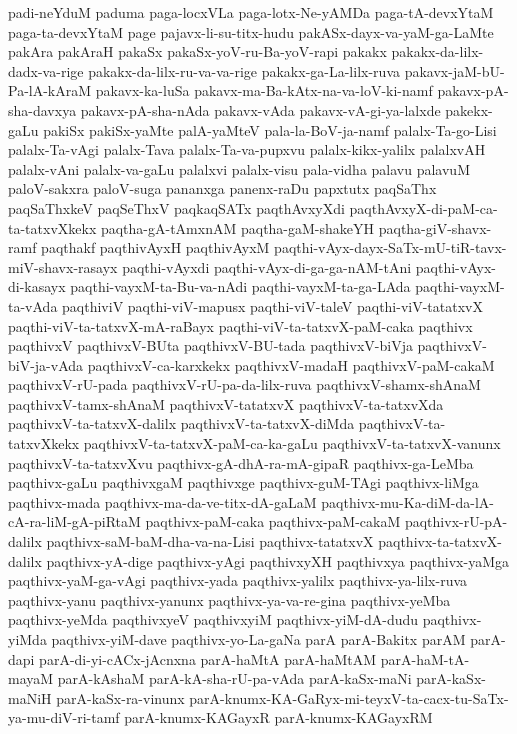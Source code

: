 {padi-neYduM
paduma
paga-locxVLa
paga-lotx-Ne-yAMDa
paga-tA-devxYtaM
paga-ta-devxYtaM
page
pajavx-li-su-titx-hudu
pakASx-dayx-va-yaM-ga-LaMte
pakAra
pakAraH
pakaSx
pakaSx-yoV-ru-Ba-yoV-rapi
pakakx
pakakx-da-lilx-dadx-va-rige
pakakx-da-lilx-ru-va-va-rige
pakakx-ga-La-lilx-ruva
pakavx-jaM-bU-Pa-lA-kAraM
pakavx-ka-luSa
pakavx-ma-Ba-kAtx-na-va-loV-ki-namf
pakavx-pA-sha-davxya
pakavx-pA-sha-nAda
pakavx-vAda
pakavx-vA-gi-ya-lalxde
pakekx-gaLu
pakiSx
pakiSx-yaMte
palA-yaMteV
pala-la-BoV-ja-namf
palalx-Ta-go-Lisi
palalx-Ta-vAgi
palalx-Tava
palalx-Ta-va-pupxvu
palalx-kikx-yalilx
palalxvAH
palalx-vAni
palalx-va-gaLu
palalxvi
palalx-visu
pala-vidha
palavu
palavuM
paloV-sakxra
paloV-suga
pananxga
panenx-raDu
papxtutx
paqSaThx
paqSaThxkeV
paqSeThxV
paqkaqSATx
paqthAvxyXdi
paqthAvxyX-di-paM-ca-ta-tatxvXkekx
paqtha-gA-tAmxnAM
paqtha-gaM-shakeYH
paqtha-giV-shavx-ramf
paqthakf
paqthivAyxH
paqthivAyxM
paqthi-vAyx-dayx-SaTx-mU-tiR-tavx-miV-shavx-rasayx
paqthi-vAyxdi
paqthi-vAyx-di-ga-ga-nAM-tAni
paqthi-vAyx-di-kasayx
paqthi-vayxM-ta-Bu-va-nAdi
paqthi-vayxM-ta-ga-LAda
paqthi-vayxM-ta-vAda
paqthiviV
paqthi-viV-mapusx
paqthi-viV-taleV
paqthi-viV-tatatxvX
paqthi-viV-ta-tatxvX-mA-raBayx
paqthi-viV-ta-tatxvX-paM-caka
paqthivx
paqthivxV
paqthivxV-BUta
paqthivxV-BU-tada
paqthivxV-biVja
paqthivxV-biV-ja-vAda
paqthivxV-ca-karxkekx
paqthivxV-madaH
paqthivxV-paM-cakaM
paqthivxV-rU-pada
paqthivxV-rU-pa-da-lilx-ruva
paqthivxV-shamx-shAnaM
paqthivxV-tamx-shAnaM
paqthivxV-tatatxvX
paqthivxV-ta-tatxvXda
paqthivxV-ta-tatxvX-dalilx
paqthivxV-ta-tatxvX-diMda
paqthivxV-ta-tatxvXkekx
paqthivxV-ta-tatxvX-paM-ca-ka-gaLu
paqthivxV-ta-tatxvX-vanunx
paqthivxV-ta-tatxvXvu
paqthivx-gA-dhA-ra-mA-gipaR
paqthivx-ga-LeMba
paqthivx-gaLu
paqthivxgaM
paqthivxge
paqthivx-guM-TAgi
paqthivx-liMga
paqthivx-mada
paqthivx-ma-da-ve-titx-dA-gaLaM
paqthivx-mu-Ka-diM-da-lA-cA-ra-liM-gA-piRtaM
paqthivx-paM-caka
paqthivx-paM-cakaM
paqthivx-rU-pA-dalilx
paqthivx-saM-baM-dha-va-na-Lisi
paqthivx-tatatxvX
paqthivx-ta-tatxvX-dalilx
paqthivx-yA-dige
paqthivx-yAgi
paqthivxyXH
paqthivxya
paqthivx-yaMga
paqthivx-yaM-ga-vAgi
paqthivx-yada
paqthivx-yalilx
paqthivx-ya-lilx-ruva
paqthivx-yanu
paqthivx-yanunx
paqthivx-ya-va-re-gina
paqthivx-yeMba
paqthivx-yeMda
paqthivxyeV
paqthivxyiM
paqthivx-yiM-dA-dudu
paqthivx-yiMda
paqthivx-yiM-dave
paqthivx-yo-La-gaNa
parA
parA-Bakitx
parAM
parA-dapi
parA-di-yi-cACx-jAcnxna
parA-haMtA
parA-haMtAM
parA-haM-tA-mayaM
parA-kAshaM
parA-kA-sha-rU-pa-vAda
parA-kaSx-maNi
parA-kaSx-maNiH
parA-kaSx-ra-vinunx
parA-knumx-KA-GaRyx-mi-teyxV-ta-cacx-tu-SaTx-ya-mu-diV-ri-tamf
parA-knumx-KAGayxR
parA-knumx-KAGayxRM
}
